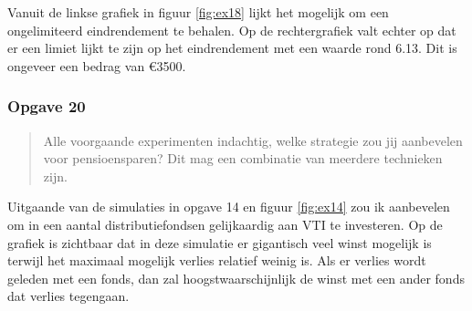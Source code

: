 \documentclass[11pt, a4paper, titlepage, openright]{article}
\begin{document}
		\noindent Vanuit de linkse grafiek in figuur \ref{fig:ex18} lijkt het mogelijk om een ongelimiteerd eindrendement te behalen. Op de rechtergrafiek valt echter
		op dat er een limiet lijkt te zijn op het eindrendement met een waarde rond 6.13. Dit is ongeveer een bedrag van \euro3500.

	\subsubsection{Opgave 20}
		\begin{quote}
			Alle voorgaande experimenten indachtig, welke strategie zou jij aanbevelen voor pensioensparen?
			Dit mag een combinatie van meerdere technieken zijn.
		\end{quote}

		\noindent Uitgaande van de simulaties in opgave 14 en figuur \ref{fig:ex14} zou ik aanbevelen om in een aantal distributiefondsen gelijkaardig aan VTI te investeren.
		Op de grafiek is zichtbaar dat in deze simulatie er gigantisch veel winst mogelijk is terwijl het maximaal mogelijk verlies relatief weinig is.
		Als er verlies wordt geleden met een fonds, dan zal hoogstwaarschijnlijk de winst met een ander fonds dat verlies tegengaan.
\end{document}
